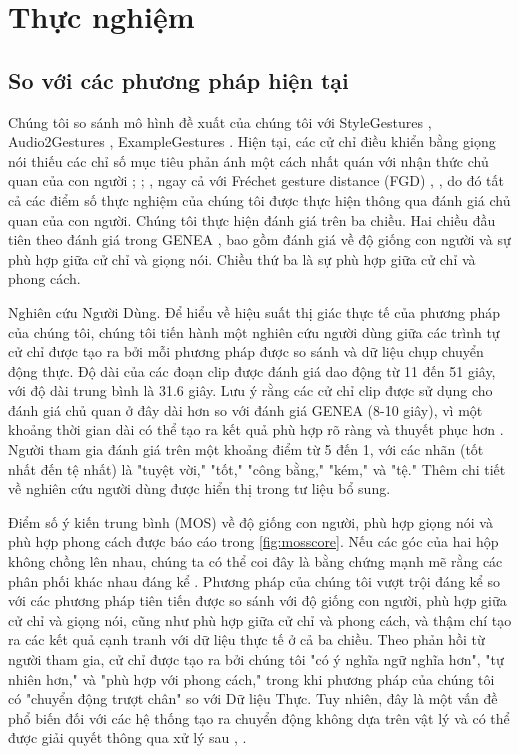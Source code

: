 \chapter{Thực nghiệm}
\label{Chapter4}

\section{So với các phương pháp hiện tại}
\label{sec:result}

Chúng tôi so sánh mô hình đề xuất của chúng tôi với StyleGestures \cite{alexanderson2020style}, Audio2Gestures \cite{li2021audio2gestures}, ExampleGestures \cite{ghorbani2023zeroeggs}. Hiện tại, các cử chỉ điều khiển bằng giọng nói thiếu các chỉ số mục tiêu phản ánh một cách nhất quán với nhận thức chủ quan của con người \cite{yoon2022genea}; \cite{kucherenko2021large}; \cite{alexanderson2022listen}, ngay cả với Fréchet gesture distance (FGD) \cite{yoon2022genea}, \cite{dabral2023mofusion}, do đó tất cả các điểm số thực nghiệm của chúng tôi được thực hiện thông qua đánh giá chủ quan của con người. Chúng tôi thực hiện đánh giá trên ba chiều. Hai chiều đầu tiên theo đánh giá trong GENEA \cite{yoon2022genea}, bao gồm đánh giá về độ giống con người và sự phù hợp giữa cử chỉ và giọng nói. Chiều thứ ba là sự phù hợp giữa cử chỉ và phong cách.

Nghiên cứu Người Dùng. Để hiểu về hiệu suất thị giác thực tế của phương pháp của chúng tôi, chúng tôi tiến hành một nghiên cứu người dùng giữa các trình tự cử chỉ được tạo ra bởi mỗi phương pháp được so sánh và dữ liệu chụp chuyển động thực. Độ dài của các đoạn clip được đánh giá dao động từ 11 đến 51 giây, với độ dài trung bình là 31.6 giây. Lưu ý rằng các cử chỉ clip được sử dụng cho đánh giá chủ quan ở đây dài hơn so với đánh giá GENEA \cite{yoon2022genea} (8-10 giây), vì một khoảng thời gian dài có thể tạo ra kết quả phù hợp rõ ràng và thuyết phục hơn \cite{yang2022reprgesture}. Người tham gia đánh giá trên một khoảng điểm từ 5 đến 1, với các nhãn (tốt nhất đến tệ nhất) là "tuyệt vời," "tốt," "công bằng," "kém," và "tệ." Thêm chi tiết về nghiên cứu người dùng được hiển thị trong tư liệu bổ sung.

Điểm số ý kiến trung bình (MOS) về độ giống con người, phù hợp giọng nói và phù hợp phong cách được báo cáo trong \autoref{fig:mosscore}. Nếu các góc của hai hộp không chồng lên nhau, chúng ta có thể coi đây là bằng chứng mạnh mẽ rằng các phân phối khác nhau đáng kể \cite{mcgill1978variations}. Phương pháp của chúng tôi vượt trội đáng kể so với các phương pháp tiên tiến được so sánh với độ giống con người, phù hợp giữa cử chỉ và giọng nói, cũng như phù hợp giữa cử chỉ và phong cách, và thậm chí tạo ra các kết quả cạnh tranh với dữ liệu thực tế ở cả ba chiều. Theo phản hồi từ người tham gia, cử chỉ được tạo ra bởi chúng tôi "có ý nghĩa ngữ nghĩa hơn", "tự nhiên hơn," và "phù hợp với phong cách," trong khi phương pháp của chúng tôi có "chuyển động trượt chân" so với Dữ liệu Thực. Tuy nhiên, đây là một vấn đề phổ biến đối với các hệ thống tạo ra chuyển động không dựa trên vật lý và có thể được giải quyết thông qua xử lý sau \cite{ghorbani2023zeroeggs}, \cite{luvizon2023scene}.

